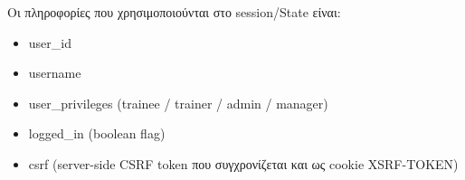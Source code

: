 \documentclass[12pt,a4paper]{report}
\begin{document}
Οι πληροφορίες που χρησιμοποιούνται στο session/State είναι:
\begin{itemize}[label=•]
    \item \textenglish{user\_id}
    \item \textenglish{username}
    \item \textenglish{user\_privileges} (\textenglish{trainee / trainer / admin / manager})
    \item \textenglish{logged\_in} (boolean flag)
    \item \textenglish{csrf} (server-side CSRF token που συγχρονίζεται και ως cookie \textenglish{XSRF-TOKEN})
\end{itemize}
\end{document}

